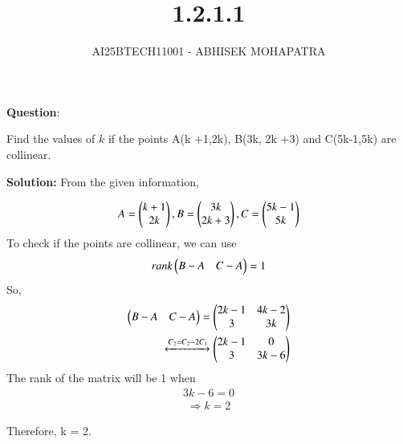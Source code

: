 \documentclass[journal]{IEEEtran}
\renewcommand{\thefigure}{\theenumi}
\renewcommand{\thetable}{\theenumi}
\numberwithin{equation}{enumi}
\numberwithin{figure}{enumi}
\renewcommand{\thetable}{\theenumi}
\begin{document}

\vspace{3cm}

\title{1.2.1.1}
\author{AI25BTECH11001 - ABHISEK MOHAPATRA}
{\let\newpage\relax\maketitle}
\renewcommand{\thefigure}{\theenumi}
\renewcommand{\thetable}{\theenumi}

		\textbf{Question}:

		\noindent Find the values of $k$ if the points A(k +1,2k), B(3k, 2k +3) and C(5k-1,5k) are collinear.

		\textbf{Solution:} From the given information,


		\begin{align}
			A = \begin{pmatrix}k+1\\2k\end{pmatrix},B = \begin{pmatrix}3k\\2k+3\end{pmatrix},C = \begin{pmatrix}5k-1\\5k\end{pmatrix} 
		\end{align}
		To check if the points are collinear, we can use 
		\begin{align}
			rank\begin{pmatrix}B-A & C-A\end{pmatrix} = 1	
		\end{align}
		So,
		\begin{align}
			\begin{pmatrix}B-A & C-A\end{pmatrix} = \begin{pmatrix}2k-1 & 4k-2 \\ 3 & 3k\end{pmatrix}	
			\\
			\xleftrightarrow[]{C_2 = C_2 - 2C_1} 
			\begin{pmatrix}2k-1 & 0 \\ 3 & 3k-6\end{pmatrix} 
		\end{align}
		The rank of the matrix will be 1 when 
		\begin{align}
		3k-6 = 0
		\end{align}
		\begin{align}
		\Rightarrow k = 2
		\end{align}

		Therefore, k = 2.
\end{document}
